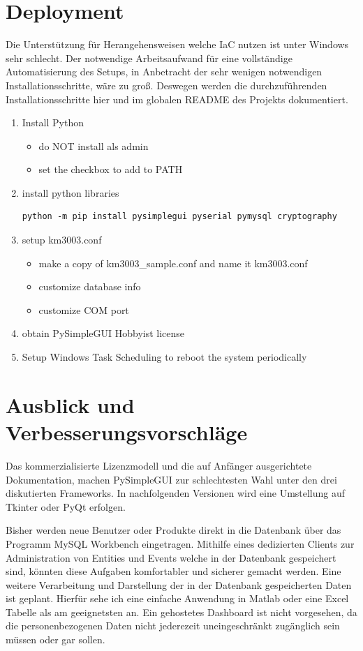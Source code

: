 \documentclass[12pt]{article}
\begin{document}
{\section{Deployment}

Die Unterstützung für Herangehensweisen welche \ac{IaC} nutzen ist unter Windows sehr schlecht. Der notwendige Arbeitsaufwand für eine vollständige Automatisierung des Setups, in Anbetracht der sehr wenigen notwendigen Installationsschritte, wäre zu groß. Deswegen werden die durchzuführenden Installationsschritte hier und im globalen README des Projekts dokumentiert.

\begin{enumerate}
    \item Install Python
    \begin{itemize}
        \item do NOT install als admin
        \item set the checkbox to add to PATH
    \end{itemize}
    \item install python libraries
    \begin{verbatim}
python -m pip install pysimplegui pyserial pymysql cryptography
    \end{verbatim}
    \item setup km3003.conf
    \begin{itemize}
        \item make a copy of km3003\_sample.conf and name it km3003.conf
        \item customize database info
        \item customize COM port
    \end{itemize}
    \item obtain PySimpleGUI Hobbyist license
    \item Setup Windows Task Scheduling to reboot the system periodically
\end{enumerate}

\section{Ausblick und Verbesserungsvorschläge}
    Das kommerzialisierte Lizenzmodell und die auf Anfänger ausgerichtete Dokumentation, machen PySimpleGUI zur schlechtesten Wahl unter den drei diskutierten Frameworks. 
    In nachfolgenden Versionen wird eine Umstellung auf Tkinter oder PyQt erfolgen.
    
    Bisher werden neue Benutzer oder Produkte direkt in die Datenbank über das Programm MySQL Workbench eingetragen. Mithilfe eines dedizierten Clients zur Administration von Entities und Events welche in der Datenbank gespeichert sind, könnten diese Aufgaben komfortabler und sicherer gemacht werden.
    Eine weitere Verarbeitung und Darstellung der in der Datenbank gespeicherten Daten ist geplant. Hierfür sehe ich eine einfache Anwendung in Matlab oder eine Excel Tabelle als am geeignetsten an. Ein gehostetes Dashboard ist nicht vorgesehen, da die personenbezogenen Daten nicht jederezeit uneingeschränkt zugänglich sein müssen oder gar sollen.


}
\end{document}
